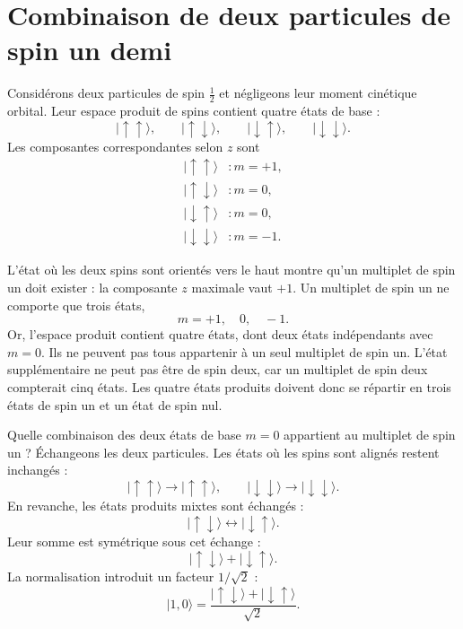 \section{Combinaison de deux particules de spin un demi}

Considérons deux particules de spin \(\tfrac12\) et négligeons leur moment cinétique orbital. Leur espace produit de spins contient quatre états de base :
\begin{equation}
|\uparrow\uparrow\rangle,\qquad
|\uparrow\downarrow\rangle,\qquad
|\downarrow\uparrow\rangle,\qquad
|\downarrow\downarrow\rangle.
\end{equation}
Les composantes correspondantes selon \(z\) sont
\begin{align}
|\uparrow\uparrow\rangle &: m=+1,\\
|\uparrow\downarrow\rangle &: m=0,\\
|\downarrow\uparrow\rangle &: m=0,\\
|\downarrow\downarrow\rangle &: m=-1.
\end{align}

L’état où les deux spins sont orientés vers le haut montre qu’un multiplet de spin un doit exister : la composante \(z\) maximale vaut \(+1\). Un multiplet de spin un ne comporte que trois états,
\begin{equation}
m=+1,\quad 0,\quad -1.
\end{equation}
Or, l’espace produit contient quatre états, dont deux états indépendants avec \(m=0\). Ils ne peuvent pas tous appartenir à un seul multiplet de spin un. L’état supplémentaire ne peut pas être de spin deux, car un multiplet de spin deux compterait cinq états. Les quatre états produits doivent donc se répartir en trois états de spin un et un état de spin nul.

Quelle combinaison des deux états de base \(m=0\) appartient au multiplet de spin un ? Échangeons les deux particules. Les états où les spins sont alignés restent inchangés :
\begin{equation}
|\uparrow\uparrow\rangle\longrightarrow|\uparrow\uparrow\rangle,
\qquad
|\downarrow\downarrow\rangle\longrightarrow|\downarrow\downarrow\rangle.
\end{equation}
En revanche, les états produits mixtes sont échangés :
\begin{equation}
|\uparrow\downarrow\rangle
\longleftrightarrow
|\downarrow\uparrow\rangle.
\end{equation}
Leur somme est symétrique sous cet échange :
\begin{equation}
|\uparrow\downarrow\rangle+|\downarrow\uparrow\rangle.
\end{equation}
La normalisation introduit un facteur \(1/\sqrt2\) :
\begin{equation}
|1,0\rangle
=
\frac{|\uparrow\downarrow\rangle
      +|\downarrow\uparrow\rangle}{\sqrt2}.
\end{equation}

